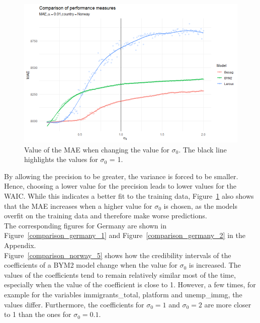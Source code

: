 \begin{figure}[H]
  \centering
  \includegraphics[width = \textwidth]{mae_norway.png}
  \caption{Value of the MAE when changing the value for $\sigma_0$. The black line highlights the values for $\sigma_0$ = 1.}
  \label{comparison_norway_2}
\end{figure}
By allowing the precision to be greater, the variance is forced to be smaller. Hence, choosing a lower value for the precision leads to lower values for the WAIC. While this indicates a better fit to the training data, Figure~\ref{comparison_norway_2} also shows that the MAE increases when a higher value for $\sigma_0$ is chosen, as the models overfit on the training data and therefore make worse predictions. \\
The corresponding figures for Germany are shown in Figure~\ref{comparison_germany_1} and Figure~\ref{comparison_germany_2} in the Appendix. \\
Figure~\ref{comparison_norway_5} shows how the credibility intervals of the coefficients of a BYM2 model change when the value for $\sigma_0$ is increased. The values of the coefficients tend to remain relatively similar most of the time, especially when the value of the coefficient is close to 1. However, a few times, for example for the variables immigrants\_total, platform and unemp\_immg, the values differ. Furthermore, the coefficients for $\sigma_0 = 1$ and $\sigma_0 = 2$ are more closer to 1 than the ones for $\sigma_0=0.1$.
